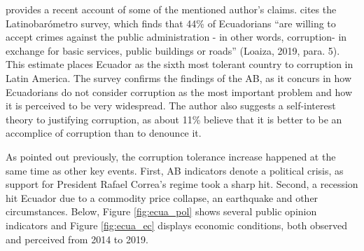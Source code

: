 \documentclass[12pt,a4]{article}\usepackage[]{graphicx}\usepackage[]{xcolor}
\begin{document}
\textcite{Loaiza.2019} provides a recent account of some of the mentioned author's claims. \textcite{Loaiza.2019} cites the Latinobarómetro survey, which finds that 44\% of Ecuadorians \enquote{are willing to accept crimes against the public administration - in other words, corruption- in exchange for basic services, public buildings or roads} (Loaiza, 2019, para. 5). This estimate places Ecuador as the sixth most tolerant country to corruption in Latin America. The survey confirms the findings of the AB, as it concurs in how Ecuadorians do not consider corruption as the most important problem and how it is perceived to be very widespread. The author also suggests a self-interest theory to justifying corruption, as about 11\% believe that it is better to be an accomplice of corruption than to denounce it. 

As pointed out previously, the corruption tolerance increase happened at the same time as other key events. First, AB indicators denote a political crisis, as support for President Rafael Correa's regime took a sharp hit. Second, a recession hit Ecuador due to a commodity price collapse, an earthquake and other circumstances. Below, Figure \ref{fig:ecua_pol} shows several public opinion indicators and Figure \ref{fig:ecua_ec} displays economic conditions, both observed and perceived from 2014 to 2019. 
\end{document}
